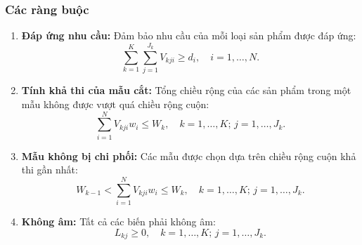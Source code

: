 \subsubsection{Các ràng buộc}  
\begin{enumerate}  
    \item \textbf{Đáp ứng nhu cầu:} Đảm bảo nhu cầu của mỗi loại sản phẩm được đáp ứng:  
    \[
    \sum_{k=1}^{K} \sum_{j=1}^{J_k} V_{kji} \geq d_i, \quad i = 1, \dots, N.
    \]  

    \item \textbf{Tính khả thi của mẫu cắt:} Tổng chiều rộng của các sản phẩm trong một mẫu không được vượt quá chiều rộng cuộn:  
    \[
    \sum_{i=1}^{N} V_{kji} w_i \leq W_k, \quad k = 1, \dots, K; \, j = 1, \dots, J_k.
    \]  

    \item \textbf{Mẫu không bị chi phối:} Các mẫu được chọn dựa trên chiều rộng cuộn khả thi gần nhất:  
    \[
    W_{k-1} < \sum_{i=1}^{N} V_{kji} w_i \leq W_k, \quad k = 1, \dots, K; \, j = 1, \dots, J_k.
    \]  

    \item \textbf{Không âm:} Tất cả các biến phải không âm:  
    \[
    L_{kj} \geq 0, \quad k = 1, \dots, K; \, j = 1, \dots, J_k.
    \]  
\end{enumerate}  